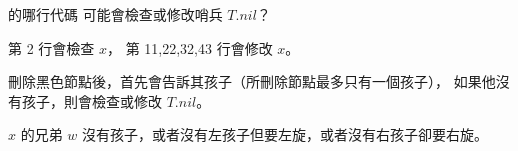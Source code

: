 \startEXERCISE
{} 的哪行代碼
可能會檢查或修改哨兵 $T.nil$？
\stopEXERCISE

\startANSWER
第 2 行會檢查 $x$，
第 11,22,32,43 行會修改 $x$。

刪除黑色節點後，首先會告訴其孩子（所刪除節點最多只有一個孩子），
如果他沒有孩子，則會檢查或修改 $T.nil$。

$x$ 的兄弟 $w$ 沒有孩子，或者沒有左孩子但要左旋，或者沒有右孩子卻要右旋。
\stopANSWER

